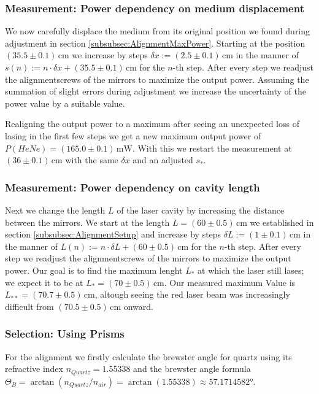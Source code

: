 \documentclass[../../main.tex]{subfiles}
\begin{document}
    \subsubsection*{Measurement: Power dependency on medium displacement}\label{subsubsec:MeasurementPowerdependencyOnDisplacement}
        We now carefully displace the medium from its original position we found during adjustment in section \ref{subsubsec:AlignmentMaxPower}. Starting at the position $(35.5\pm 0.1)\,\si{\cm}$ we increase by steps $\delta x := (2.5\pm 0.1)\,\si{\cm}$ in the manner of $s(n):=n\cdot \delta x + (35.5\pm 0.1)\,\si{\cm}$ for the $n$-th step. After every step we readjust the alignmentscrews of the mirrors to maximize the output power. Assuming the summation of slight errors during adjustment we increase the uncertainty of the power value by a suitable value. 

        Realigning the output power to a maximum after seeing an unexpected loss of lasing in the first few steps we get a new maximum output power of $P(HeNe) = (165.0\pm 0.1)\,\si{\mW}$. With this we restart the measurement at $(36\pm 0.1)\,\si{\cm}$ with the same $\delta x$ and an adjusted $s_*$.

    \subsubsection*{Measurement: Power dependency on cavity length}
        Next we change the length $L$ of the laser cavity by increasing the distance between the mirrors. We start at the length $L = (60\pm 0.5)\,\si{\cm}$ we established in section \ref{subsubsec:AlignmentSetup} and increase by steps $\delta L := (1\pm 0.1)\,\si{\cm}$ in the manner of $L(n):=n\cdot \delta L + (60\pm 0.5)\,\si{\cm}$ for the $n$-th step. After every step we readjust the alignmentscrews of the mirrors to maximize the output power. Our goal is to find the maximum lenght $L_*$ at which the laser still lases; we expect it to be at $L_* = (70\pm 0.5)\,\si{\cm}$. Our measured maximum Value is $L_{**} = (70.7\pm 0.5)\,\si{\cm}$, altough seeing the red laser beam was increasingly difficult from $(70.5\pm 0.5)\,\si{\cm}$ onward. 

    \subsubsection*{Selection: Using Prisms}
        For the alignment we firstly calculate the brewster angle for quartz using its refractive index $n_{\textit{Quartz}} = 1.55338$ and the brewster angle formula $\Theta_{B} = \arctan(n_{\textit{Quartz}}/n_{\textit{air}}) = \arctan(1.55338) \approx 57.1714582\si{\degree}$.
\end{document}
